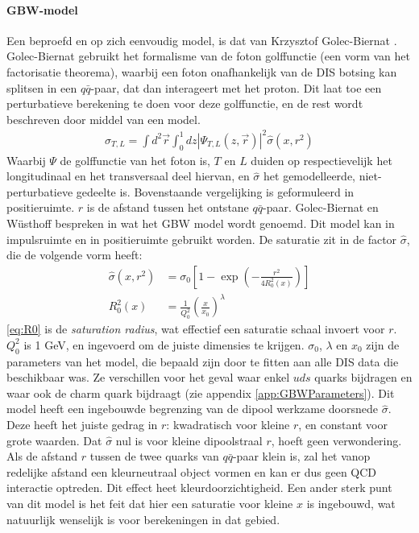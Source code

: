 \documentclass[a4paper,11pt]{article}
\numberwithin{equation}{section} %
\begin{document}
      \paragraph{GBW-model}
Een beproefd en op zich eenvoudig model, is dat van Krzysztof Golec-Biernat \cite{GB}.
Golec-Biernat gebruikt het formalisme van de foton golffunctie (een vorm van het factorisatie theorema), waarbij een foton onafhankelijk van de DIS botsing kan splitsen in een $q\bar{q}$-paar, dat dan interageert met het proton.
Dit laat toe een perturbatieve berekening te doen voor deze golffunctie, en de rest wordt beschreven door middel van een model.
\begin{align}
\sigma_{T,L} = \int d^2 \vec{r} \int_0^1 dz |\Psi_{T,L} (z, \vec{r})|^2 \hat{\sigma} (x,r^2)
\end{align}
Waarbij $\Psi$ de golffunctie van het foton is, $T$ en $L$ duiden op respectievelijk het longitudinaal en het transversaal deel hiervan, en $\hat{\sigma}$ het gemodelleerde, niet-perturbatieve gedeelte is.
Bovenstaande vergelijking is geformuleerd in positieruimte.
$r$ is de afstand tussen het ontstane $q\bar{q}$-paar.
Golec-Biernat en Wüsthoff bespreken in \cite{GBW} wat het GBW model wordt genoemd.
Dit model kan in impulsruimte en in positieruimte gebruikt worden.
De saturatie zit in de factor $\hat{\sigma}$, die de volgende vorm heeft:
\begin{align}
\hat{\sigma}(x,r^2) &= \sigma_0 \left[ 1- \exp{\left(-\frac{r^2}{4 R_0^2(x)}\right)} \right] \\
R_0^2(x) &= \frac{1}{Q_0^2} \left( \frac{x}{x_0} \right)^\lambda \label{eq:R0}
\end{align}
\eqref{eq:R0} is de \textit{saturation radius}, wat effectief een saturatie schaal invoert voor $r$.
$Q_0^2$ is 1 GeV, en ingevoerd om de juiste dimensies te krijgen.
$\sigma_0$, $\lambda$ en $x_0$ zijn de parameters van het model, die bepaald zijn door te fitten aan alle DIS data die beschikbaar was.
Ze verschillen voor het geval waar enkel $uds$ quarks bijdragen en waar ook de charm quark bijdraagt (zie appendix \ref{app:GBWParameters}).
Dit model heeft een ingebouwde begrenzing van de dipool werkzame doorsnede $\hat{\sigma}$.
Deze heeft het juiste gedrag in $r$: kwadratisch voor kleine $r$, en constant voor grote waarden.
Dat $\hat{\sigma}$ nul is voor kleine dipoolstraal $r$, hoeft geen verwondering.
Als de afstand $r$ tussen de twee quarks van $q\bar{q}$-paar klein is, zal het vanop redelijke afstand een kleurneutraal object vormen en kan er dus geen QCD interactie optreden.
Dit effect heet kleurdoorzichtigheid.
Een ander sterk punt van dit model is het feit dat hier een saturatie voor kleine $x$ is ingebouwd, wat natuurlijk wenselijk is voor berekeningen in dat gebied.
\end{document}
